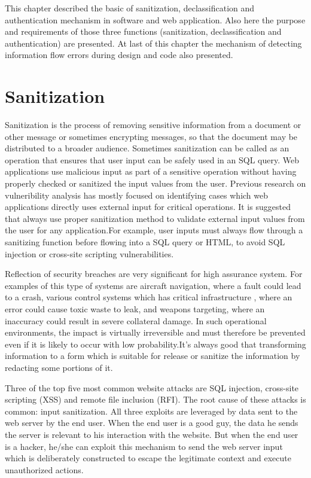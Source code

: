 This chapter described the basic of sanitization, declassification and authentication mechanism in software and web application. Also here the purpose and requirements of those three functions (sanitization, declassification and authentication) are presented. At last of this chapter the mechanism of detecting information flow errors during design and code also presented.

\section{Sanitization}
Sanitization is the process of removing sensitive information from a document or other message or sometimes encrypting messages, so that the document may be distributed to a broader audience. Sometimes sanitization can be called as an operation that ensures that user input can be safely used in an SQL query. Web applications use malicious input as part of a sensitive operation without having properly checked or sanitized the input values from the user. Previous research on vulneribility analysis has mostly focused on identifying cases which web applications directly uses external input for critical operations. It is suggested that always use proper sanitization method to validate external input values from the user for any application.For example, user inputs must always flow through a sanitizing function before flowing into a SQL query or HTML, to avoid SQL injection or cross-site scripting vulnerabilities.

Reflection of security breaches are very significant for high assurance system. For examples of this type of systems are aircraft navigation, where a fault could lead to a crash, various control systems which has critical infrastructure , where an error 
could cause toxic waste to leak, and weapons targeting, where an inaccuracy could result in severe collateral damage. In such
operational environments, the impact is virtually irreversible and must therefore be prevented even if it is likely to occur
with low probability.It's always good that transforming information to a form which is suitable for release or sanitize the information by redacting some portions of it.

Three of the top five most common website attacks are SQL injection, cross-site scripting (XSS) and remote file inclusion (RFI). The root cause of these attacks is common: input sanitization. All three exploits are leveraged by data sent to the web server by the end user. When the end user is a good guy, the data he sends the server is relevant to his interaction with the website. But when the end user is a hacker, he/she can exploit this mechanism to send the web server input which is deliberately constructed to escape the legitimate context and execute unauthorized actions.


